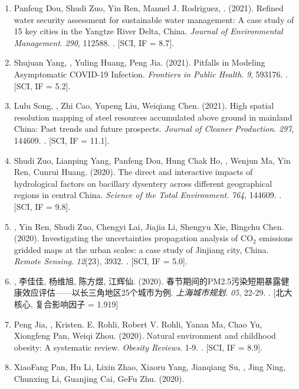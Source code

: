 \begin{enumerate}
\item
    Panfeng Dou, Shudi Zuo, Yin Ren, Manuel J. Rodriguez, \Shaoqing. (2021).
    Refined water security assessment for sustainable water management: A case study of 15 key cities in the Yangtze River Delta, China.
    \textit{Journal of Environmental Management}. \textit{290}, 112588.
    . [SCI, IF = 8.7].
\item
    Shujuan Yang, \Shaoqing, Yuling Huang, Peng Jia. (2021).
    Pitfalls in Modeling Asymptomatic COVID-19 Infection.
    \textit{Frontiers in Public Health}. \textit{9}, 593176.
    . [SCI, IF = 5.2].
\item
    Lulu Song, \Shaoqing, Zhi Cao, Yupeng Liu, Weiqiang Chen. (2021).
    High spatial resolution mapping of steel resources accumulated above ground in mainland China: Past trends and future prospects.
    \textit{Journal of Cleaner Production}. \textit{297}, 144609.
    . [SCI, IF = 11.1].
\item
    Shudi Zuo, Lianping Yang, Panfeng Dou, Hung Chak Ho, \Shaoqing, Wenjun Ma, Yin Ren, Cunrui Huang. (2020).
    The direct and interactive impacts of hydrological factors on bacillary dysentery across different geographical regions in central China.
    \textit{Science of the Total Environment}. \textit{764}, 144609.
    . [SCI, IF = 9.8].
\item
    \Shaoqing\CF, Yin Ren\CF, Shudi Zuo, Chengyi Lai, Jiajia Li, Shengyu Xie, Bingchu Chen. (2020).
    Investigating the uncertainties propagation analysis of CO$_2$ emissions gridded maps at the urban scales: a case study of Jinjiang city, China. 
    \textit{Remote Sensing}. \textit{12}(23), 3932.
    . [SCI, IF = 5.0].
\item
    {}, 李佳佳, 杨维旭, 陈方煜, 江辉仙. (2020).
    春节期间的PM2.5污染短期暴露健康效应评估——以长三角地区25个城市为例.
    \textit{上海城市规划}. \textit{05}, 22-29.
    . [北大核心, 复合影响因子 = 1.919] 
\item
    Peng Jia, \Shaoqing, Kristen. E. Rohli, Robert V. Rohli, Yanan Ma, Chao Yu, Xiongfeng Pan, Weiqi Zhou. (2020).
    Natural environment and childhood obesity: A systematic review.
    \textit{Obesity Reviews}. 1-9.
    . [SCI, IF = 8.9].
\item
    XiaoFang Pan, Hu Li, Lixin Zhao, Xiaoru Yang, Jianqiang Su, \Shaoqing, Jing Ning, Chunxing Li, Guanjing Cai, GeFu Zhu. (2020).

\end{enumerate}
